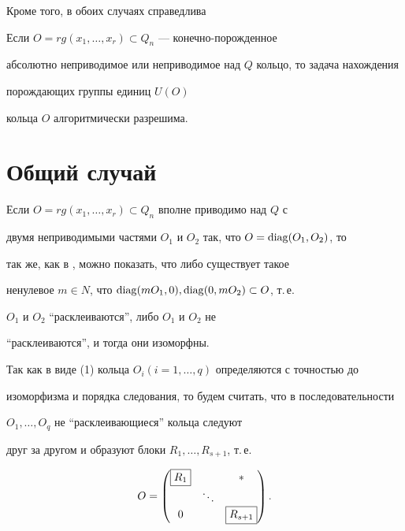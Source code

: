 Кроме того, в обоих случаях справедлива








\begin{thm}


Если $O=rg(x_1,\dotsc,x_r)\subset Q_n $ --- конечно-порожденное


абсолютно неприводимое или неприводимое над $Q$ кольцо, то задача нахождения


порождающих группы единиц $U(O)$


кольца $O$ алгоритмически разрешима.


\end{thm}








\section{Общий случай}








Если $O=rg(x_1,\dotsc,x_r)\subset Q_n $ вполне приводимо над $Q$ с


двумя неприводимыми частями $O_1$ и $O_2$ так, что $O=\operatorname{diag} (O_1,O_2)$, то


так же, как в \cite{Pop7}, можно показать, что либо существует такое


ненулевое $m\in N$, что $\operatorname{diag} (mO_1,0), \operatorname{diag}(0,mO_2)\subset O$, т.\,е.


$O_1$ и $O_2$ ``расклеиваются'', либо $O_1$ и $O_2$ не


``расклеиваются'', и тогда они изоморфны.





Так как в виде (1) кольца $O_i(i=1,\dotsc,q)$ определяются с точностью до


изоморфизма и порядка следования, то будем считать, что в последовательности


$O_1,\dotsc,O_q$ не ``расклеивающиеся'' кольца следуют


друг за другом и образуют блоки $R_1,\dotsc,R_{s+1}$, т.\,е.


\begin{equation} 


O=


\begin{pmatrix}


\framebox{$R_1$} & & * \\ 


& \ddots & \\ 


0 & & \framebox{$R_{s+1}$}


\end{pmatrix}


.


\end{equation}


